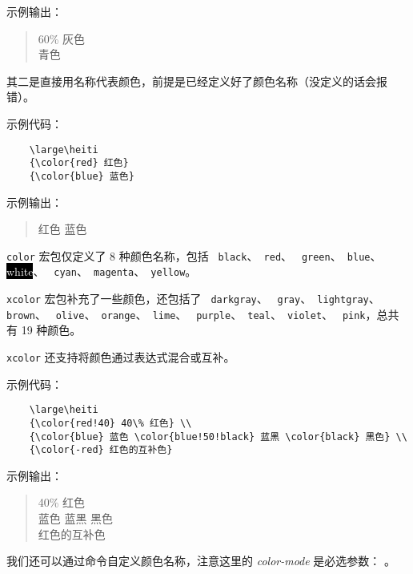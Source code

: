 \documentclass[UTF8]{ctexart}
\begin{document}
示例输出：
\begin{quote}
    \large\heiti
    {\color[gray]{0.6} 60\% 灰色} \\
    {\color[rgb]{0, 1, 1} 青色}
\end{quote}

其二是直接用名称代表颜色，前提是已经定义好了颜色名称（没定义的话会报错）。

示例代码：
\begin{verbatim}
    \large\heiti
    {\color{red} 红色}
    {\color{blue} 蓝色}
\end{verbatim}

示例输出：
\begin{quote}
    \large\heiti
    {\color{red} 红色}
    {\color{blue} 蓝色}
\end{quote}

\texttt{color} 宏包仅定义了 8 种颜色名称，包括 \texttt{{\color{black} black}}、\texttt{{\color{red} red}}、
\texttt{{\color{green} green}}、\texttt{{\color{blue} blue}}、\colorbox{black}{\textcolor{white}{white}}、
\texttt{{\color{cyan} cyan}}、\texttt{{\color{magenta} magenta}}、\texttt{{\color{yellow} yellow}}。

\texttt{xcolor} 宏包补充了一些颜色，还包括了 \texttt{{\color{darkgray} darkgray}}、
\texttt{{\color{gray} gray}}、\texttt{{\color{lightgray} lightgray}}、\texttt{{\color{brown} brown}}、
\texttt{{\color{olive} olive}}、\texttt{{\color{orange} orange}}、\texttt{{\color{lime} lime}}、
\texttt{{\color{purple} purple}}、\texttt{{\color{teal} teal}}、\texttt{{\color{violet} violet}}、
\texttt{{\color{pink} pink}}，总共有 19 种颜色。

\texttt{xcolor} 还支持将颜色通过表达式混合或互补。

示例代码：
\begin{verbatim}
    \large\heiti
    {\color{red!40} 40\% 红色} \\
    {\color{blue} 蓝色 \color{blue!50!black} 蓝黑 \color{black} 黑色} \\
    {\color{-red} 红色的互补色}
\end{verbatim}

示例输出：
\begin{quote}
    \large\heiti
    {\color{red!40} 40\% 红色} \\
    {\color{blue} 蓝色 \color{blue!50!black} 蓝黑 \color{black} 黑色} \\
    {\color{-red} 红色的互补色}
\end{quote}

我们还可以通过命令自定义颜色名称，注意这里的 \emph{color-mode} 是必选参数：
\texttt{}。
\end{document}
